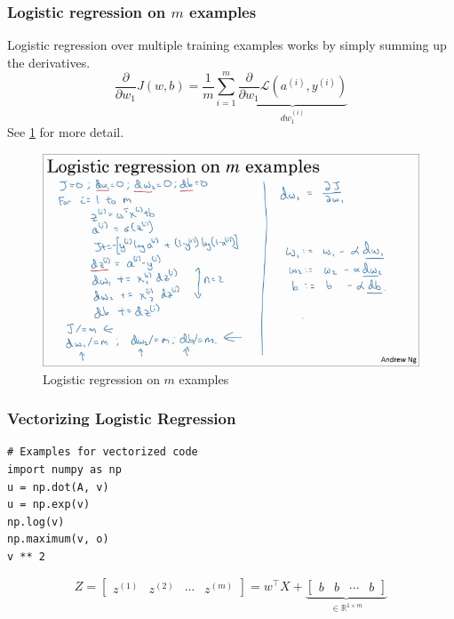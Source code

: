 \documentclass{article}
\begin{document}
\subsubsection{Logistic regression on $m$ examples}
Logistic regression over multiple training examples works by simply summing up the derivatives.
\begin{equation}
  \frac{\partial}{\partial w_1}J(w,b)=\frac{1}{m}\sum_{i=1}^m\underbrace{\frac{\partial}{\partial w_1}\mathcal{L}(a^{(i)},y^{(i)})}_{dw_1^{(i)}}
\end{equation}
See \cref{fig:logistic-regression} for more detail.
\begin{figure}
  \begin{center}
    \includegraphics[width=\textwidth]{logistic-regression}
    \caption{Logistic regression on $m$ examples}
    \label{fig:logistic-regression}
  \end{center}
\end{figure}

\subsubsection{Vectorizing Logistic Regression}
\begin{verbatim}
# Examples for vectorized code
import numpy as np
u = np.dot(A, v)
u = np.exp(v)
np.log(v)
np.maximum(v, o)
v ** 2
\end{verbatim}

\begin{equation}
  Z=\begin{bmatrix}z^{(1)} & z^{(2)} & \cdots & z^{(m)}\end{bmatrix}=
    w^\top X + \underbrace{\begin{bmatrix}b & b & \cdots & b\end{bmatrix}}_{\in\mathbb{R}^{1\times m}}
\end{equation}
\end{document}
